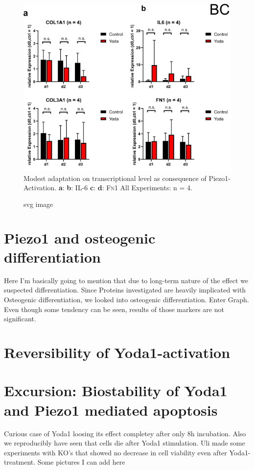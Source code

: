 \begin{figure}[ht]
    \centering
    \includegraphics[scale = 0.6]{Collection.png}
    \caption{
    Modest adaptation on transcriptional level as consequence of Piezo1-Activation. \hfill \newline
    \textbf{a}: \colone{}
    \textbf{b}: IL-6
    \textbf{c}: \colthree{}
    \textbf{d}: \textsc{Fn}1
    All Experiments: n = 4. 
    }
    \label{fig:my_label}
\end{figure}


\begin{figure}[htbp]
  \centering
  
  \caption{svg image}
\end{figure}

\section{Piezo1 and osteogenic differentiation}
Here I'm basically going to mention that due to long-term nature of the effect we suspected differentiation. Since Proteins investigated are heavily implicated with Osteogenic differentiation, we looked into osteogenic differentiation. Enter Graph. Even though some tendency can be seen, results of those markers are not significant. 

\section{Reversibility of Yoda1-activation}


\section{Excursion: Biostability of Yoda1 and Piezo1 mediated apoptosis}
\label{sec:biostability}
Curious case of Yoda1 loosing its effect completey after only 8h incubation. Also we reproducibly have seen that cells die after Yoda1 stimulation. Uli made some experiments with KO's that showed no decrease in cell viability even after Yoda1-treatment. Some pictures I can add here
